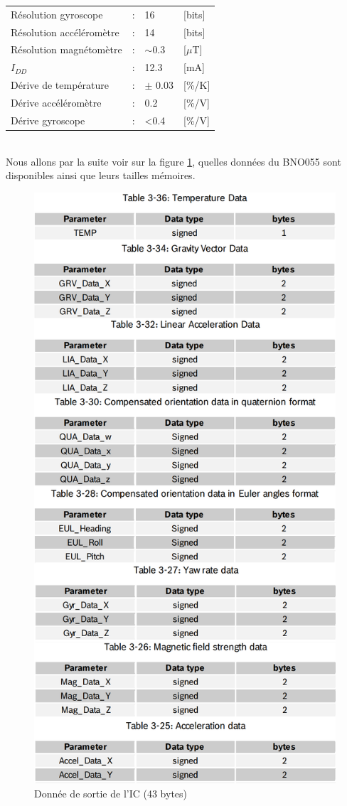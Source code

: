 {{    \begin{tabular}{l l l l}
        Résolution gyroscope & : & 16 & [bits] \\
        Résolution accéléromètre & : & 14 & [bits] \\
        Résolution magnétomètre & : & $\sim$0.3 & [$\mu$T] \\
        $I_{DD}$ & : & 12.3 & [mA] \\
        Dérive de température & : & $\pm$ 0.03 & [\%/K] \\ 
        Dérive accéléromètre & : & 0.2 & [\%/V] \\
        Dérive gyroscope & : & <0.4 & [\%/V]
    \end{tabular} \\
    Nous allons par la suite voir sur la figure \ref{fig:BnoOut}, quelles données du BNO055 sont disponibles ainsi que leurs tailles mémoires.
    
    \begin{figure}[h] 
        \centering
        \includegraphics[width=.68\textwidth]{Figures/DATAS-BNO055}
        \caption{Donnée de sortie de l'IC (43 bytes)}
        \label{fig:BnoOut}
    \end{figure}
}

}
